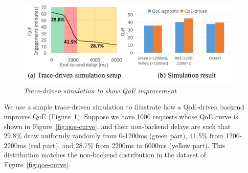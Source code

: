 

\begin{figure}
	\centering
	\vspace{-0.4cm}
	\includegraphics[width=1.0\textwidth]{figs/simulation.pdf}
	\vspace{-1.cm}
	\caption{\em Trace-driven simulation to show QoE improvement}
	\label{fig:simulation}
\end{figure}
We use a simple trace-driven simulation to illustrate how a QoE-driven backend improves QoE (Figure~\ref{fig:simulation}).
Suppose we have 1000 requests whose QoE curve is shown in Figure~\ref{fig:qoe-curve}, and their non-backend delays are such that 29.8\% draw uniformly randomly from 0-1200ms (green part), 41.5\% from 1200-2200ms (red part), and 28.7\% from 2200ms to 6000ms (yellow part). This distribution matches the non-backend distribution in the dataset of Figure~\ref{fig:qoe-curve}.
